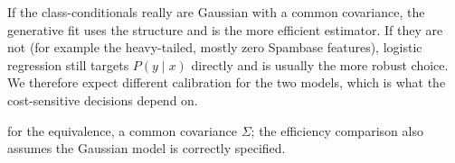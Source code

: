 If the class-conditionals really are Gaussian with a common covariance, the generative fit uses the
structure and is the more efficient estimator. If they are not (for example the heavy-tailed, mostly zero
Spambase features), logistic regression still targets $P(y\mid x)$ directly and is usually the more
robust choice. We therefore expect different calibration for the two models, which is what the
cost-sensitive decisions depend on.

\begin{assumptions}
for the equivalence, a common covariance $\Sigma$; the efficiency comparison also
assumes the Gaussian model is correctly specified.
\end{assumptions}
